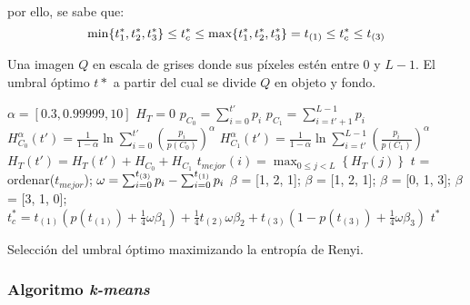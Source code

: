 por ello, se sabe que:
$$\min\{t_1^*, t^*_2, t^*_3 \}\leq t_c^* \leq\max\{t_1^*, t^*_2, t^*_3\} = t_{(1)} \leq t_c^* \leq t_{(3)}$$

\begin{algorithm}
\begin{algorithmic}[1]
\REQUIRE Una imagen $Q$ en escala de grises donde sus píxeles estén entre $0$ y $L-1$.
\ENSURE El umbral óptimo $t*$ a partir del cual se divide $Q$ en objeto y fondo.

\STATE $\alpha = [0.3, 0.99999, 10]$
    \STATE $H_T=0$
        \STATE $p_{C_0} = \sum_{i=0}^{t'}p_i$
        \STATE $p_{C_1} = \sum_{i=t'+1}^{L-1}p_i$
        \STATE $H_{C_0}^{\alpha}(t') = \frac{1}{1-\alpha}\ln \sum_{i=0}^{t'}\left(\frac{p_i}{p(C_0)}\right)^\alpha$
        \STATE $H_{C_1}^{\alpha}(t') = \frac{1}{1-\alpha}\ln \sum_{i=t'}^{L-1}\left(\frac{p_i}{p(C_1)}\right)^\alpha$
        \STATE $H_T(t') = H_T(t') + H_{C_0} +H_{C_1}$
     \ENDFOR
    \STATE $t_{mejor}(i) = \max_{0\leq j<L}\left\{H_T(j)\right\}$
\ENDFOR
\STATE $t$ = ordenar($t_{mejor}$);
\STATE $\omega =\sum_{i=0}^{t_{(3)}}p_i - \sum_{i=0}^{t_{(1)}}p_i$
    \STATE $\beta$ = [1, 2, 1];
    \STATE $\beta$ = [1, 2, 1];
    \STATE $\beta$ = [0, 1, 3];
    \STATE $\beta$ = [3, 1, 0];
\ENDIF
\STATE $t^*_c = t_{(1)} \left(p(t_{(1)})+\frac{1}{4}\omega\beta_1\right) + \frac{1}{4}t_{(2)}\omega\beta_2 + t_{(3)} \left(1-p(t_{(3)})+\frac{1}{4}\omega\beta_3\right)$
\RETURN $t^*$
\end{algorithmic}
\caption{Selección del umbral óptimo maximizando la entropía de Renyi.}\label{alg:renyi}
\end{algorithm}


\subsubsection{Algoritmo {\em k-means}}



